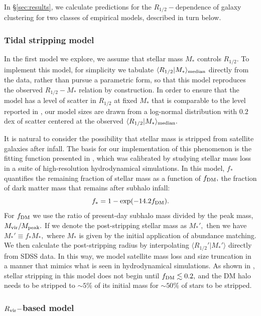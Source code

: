 \documentclass[usenatbib,usegraphicx,letterpaper]{mn2e}
\newcommand{\beq}{\begin{equation}}
\newcommand{\eeq}{\end{equation}}
\newcommand{\rhalf}{R_{1/2}}
\newcommand{\mstar}{M_{\ast}}
\newcommand{\rvir}{R_{\rm vir}}
\newcommand{\median}[2]{\langle{#1}\vert{#2}\rangle_{\rm median}}
\begin{document}
In \S\ref{sec:results}, we calculate predictions for the $\rhalf-$dependence of galaxy clustering for two classes of empirical models, described in turn below.

\subsubsection{Tidal stripping model}
\label{subsubsec:strippingmodel}

In the first model we explore, we assume that stellar mass $\mstar$ controls $\rhalf.$ To implement this model, for simplicity we tabulate $\median{\rhalf}{\mstar}$ directly from the data, rather than pursue a parametric form, so that this model reproduces the observed $\rhalf-\mstar$ relation by construction. In order to ensure that the model has a level of scatter in $\rhalf$ at fixed $\mstar$ that is comparable to the level reported in \citet{somerville_etal17}, our model sizes are drawn from a log-normal distribution with $0.2$ dex of scatter centered at the observed $\median{\rhalf}{\mstar}.$ 

It is natural to consider the possibility that stellar mass is stripped from satellite galaxies after infall. The basis for our implementation of this phenomenon is the fitting function presented in \citet{smith_etal16}, which was calibrated by studying stellar mass loss in a suite of high-resolution hydrodynamical simulations. In this model, $f_{\ast}$ quantifies the remaining fraction of stellar mass as a function of $f_{\rm DM},$ the fraction of dark matter mass that remains after subhalo infall:
\beq
f_{\ast} = 1 - \exp(-14.2f_{\rm DM}).
\eeq
For $f_{\rm DM}$ we use the ratio of present-day subhalo mass divided by the peak mass, $M_{\rm vir}/M_{\rm peak}.$ If we denote the post-stripping stellar mass as $M_{\ast}',$ then we have $M_{\ast}'\equiv f_{\ast}M_{\ast},$ where $M_{\ast}$ is given by the initial application of abundance matching. We then calculate the post-stripping radius by interpolating $\langle\rhalf'\vert\mstar'\rangle$ directly from SDSS data. In this way, we model satellite mass loss and  size truncation in a manner that mimics what is seen in hydrodynamical simulations. As shown in \citet{smith_etal16}, stellar stripping in this model does not begin until $f_{\rm DM}\lesssim0.2,$ and the DM halo needs to be stripped to $\sim5\%$ of its initial mass for $\sim50\%$ of stars to be stripped.


\subsubsection{$\rvir-$based model}
\label{subsubsec:rvirmodel}
\end{document}
